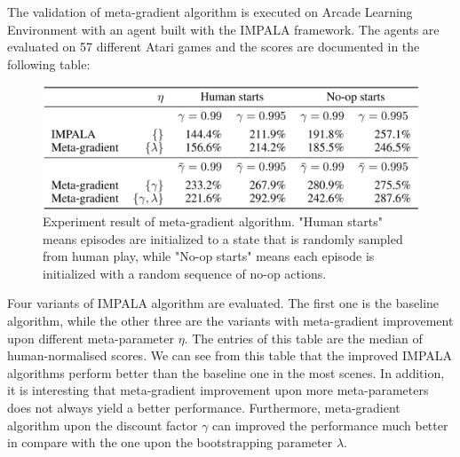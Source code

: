 \par
The validation of meta-gradient algorithm is executed on Arcade Learning Environment with an agent built with the IMPALA framework. The agents are evaluated on 57 different Atari games and the scores are documented in the following table:
\begin{figure}[H]
	\includegraphics[scale=0.3]{meta-gradient-result.png}
	\centering
	\caption{Experiment result of meta-gradient algorithm. "Human starts" means episodes are initialized to a state that is randomly sampled from human play, while "No-op starts" means each episode is initialized with a random sequence of no-op actions.}
	\label{meta-gradient-result}
\end{figure}
Four variants of IMPALA algorithm are evaluated. The first one is the baseline algorithm, while the other three are the variants with meta-gradient improvement upon different meta-parameter $\eta$. The entries of this table are the median of human-normalised scores. We can see from this table that the improved IMPALA algorithms perform better than the baseline one in the most scenes. In addition, it is interesting that meta-gradient improvement upon more meta-parameters does not always yield a better performance. Furthermore, meta-gradient algorithm upon the discount factor $\gamma$ can improved the performance much better in compare with the one upon the bootstrapping parameter $\lambda$.
% 
% 
% 
